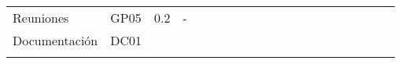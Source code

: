 \begin{longtable}[c]{llclllllllllllllllll}
        \multicolumn{1}{|l|}{Reuniones}                                                                                         & \multicolumn{1}{l|}{GP05}                                                      & \multicolumn{1}{l|}{0.2}                                                         & \multicolumn{1}{l|}{-}                                                               &                                 &                                 &                                 &                                 &                                 &                                 &                                 &                                 & \cellcolor[HTML]{EF8787}        &                                 &                                 &                                 &                                 &                                 & \multicolumn{1}{l|}{}                         &  \\ \cline{1-4}
        \multicolumn{1}{|l|}{Documentación}                                                                                     & \multicolumn{1}{l|}{DC01}                                                      & \multicolumn{1}{l|}{}                                                            & \multicolumn{1}{l|}{}                                                                &                                 &                                 &                                 &                                 &                                 &                                 &                                 &                                 &                                 &                                 &                                 &                                 &                                 &                                 & \multicolumn{1}{l|}{}                         &  \\ \cline{1-19}
        \multicolumn{4}{|l|}{}                                                                                                                                                                                                                                                                                                                                                             & \multicolumn{15}{l|}{}                                                                                                                                                                                                                                                                                                                                                                                                                                                                                                                    &  \\ \cline{1-19}

\end{longtable}
